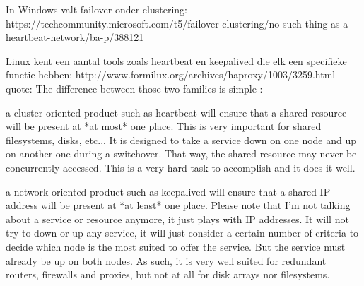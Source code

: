 In Windows valt failover onder clustering:
https://techcommunity.microsoft.com/t5/failover-clustering/no-such-thing-as-a-heartbeat-network/ba-p/388121

Linux kent een aantal tools zoals heartbeat en keepalived die elk een specifieke functie hebben:
http://www.formilux.org/archives/haproxy/1003/3259.html
quote:
 The difference between those two families is simple :

    a cluster-oriented product such as heartbeat will ensure that a shared resource will be present at *at most* one place. This is very important for shared filesystems, disks, etc... It is designed to take a service down on one node and up on another one during a switchover. That way, the shared resource may never be concurrently accessed. This is a very hard task to accomplish and it does it well.

    a network-oriented product such as keepalived will ensure that a shared IP address will be present at *at least* one place. Please note that I'm not talking about a service or resource anymore, it just plays with IP addresses. It will not try to down or up any service, it will just consider a certain number of criteria to decide which node is the most suited to offer the service. But the service must already be up on both nodes. As such, it is very well suited for redundant routers, firewalls and proxies, but not at all for disk arrays nor filesystems. 
